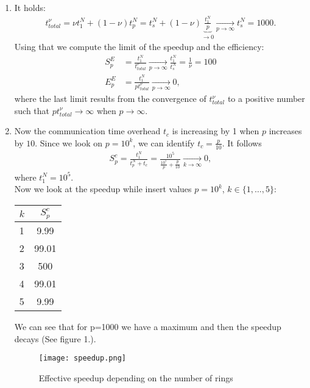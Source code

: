 \documentclass{article}
\begin{document}
\begin{enumerate}[label=(\alph*)]
  \item It holds: 
    \begin{align*}
      t^{\nu}_{total} = \nu t_1^N + (1-\nu)t_p^N = t_s^N + (1-\nu)\underbrace{\frac{t_1^N}{p}}_{\to 0} \xrightarrow[p \to \infty]{} t_s^N=1000.
    \end{align*}
    Using that we compute the limit of the speedup and the efficiency:
    \begin{align*}
      S_p^E &= \frac{t_1^N}{t_{total}^\nu}\xrightarrow[p \to \infty]{} \frac{t_1^N}{t_s^N}=\frac{1}{\nu}=100\\
      E_p^E &= \frac{t_1^N}{pt_{total}^\nu}\xrightarrow[p \to \infty]{}0,
    \end{align*}
    where the last limit results from the convergence of $t^\nu_{total}$ to a positive number such that $pt^\nu_{total}\to\infty$ when $p\to\infty$.
  \item Now the communication time overhead $t_c$ is increasing by 1 when $p$ increases by $10$. Since we look on $p=10^k$, we can identify $t_c=\frac{p}{10}$.
    It follows
    \begin{align*}
      S^c_p = \frac{t_1^N}{t_p^N+t_c} = \frac{10^5}{\frac{10^5}{p} + \frac{p}{10}} \xrightarrow[k \to \infty]{} 0,
    \end{align*}
    where $t_1^N = 10^5$.\\
    Now we look at the speedup while insert values $p=10^k$, $k\in\{1,\dots,5\}$:
    \begin{center}
      \begin{tabular}{ l | c } 
        $k$ & $S_p^c$ \\
        \hline
        1 & 9.99 \\
        2 & 99.01 \\
        3 & 500 \\
        4 & 99.01 \\
        5 & 9.99 \\
      \end{tabular}        
    \end{center}
    We can see that for p=1000 we have a maximum and then the speedup decays (See figure 1.).
    \begin{figure}[hbt!]
      \centering
      \texttt{[image: speedup.png]}
      \caption{Effective speedup depending on the number of rings}
    \end{figure}
\end{enumerate}
\end{document}
